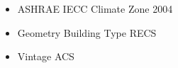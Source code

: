 \begin{itemize}
\item ASHRAE IECC Climate Zone 2004
\item Geometry Building Type RECS
\item Vintage ACS
\end{itemize}
